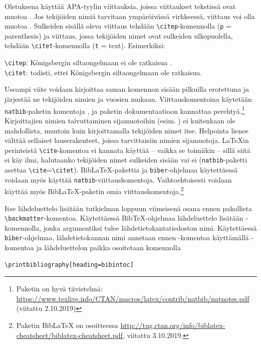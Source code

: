 Oletuksena \uefcsthesis käyttää APA-tyylin viittauksia, joissa viittaukset tekstissä ovat muotoa . Jos tekijöiden nimiä tarvitaan ympäröivässä virkkeessä, viittaus voi olla muotoa . Sulkeiden sisällä oleva viittaus tehdään \verb+\citep+-komennolla (\texttt{p} = parenthesis) ja viittaus, jossa tekijöiden nimet ovat sulkeiden ulkopuolella, tehdään \verb+\citet+-komennolla (\texttt{t} = text). Esimerkiksi:
\begin{displayquote}
  \verb+\citep+: Königsbergin siltaongelmaan ei ole ratkaisua \citep{euler36solutio}.\\
  \verb+\citet+: \citet{euler36solutio} todisti, ettei Königsbergin siltaongelmaan ole ratkaisua.
\end{displayquote}

Useampi viite voidaan kirjoittaa saman komennon sisään pilkuilla erotettuna ja \uefcsthesis järjestää ne tekijöiden nimien ja vuosien mukaan. Viittauskomentoina käytetään \texttt{natbib}-paketin komentoja \citep{natbib}, ja paketin dokumentaatioon kannattaa perehtyä.\footnote{Paketin  on hyvä tiivistelmä: \url{https://www.texlive.info/CTAN/macros/latex/contrib/natbib/natnotes.pdf} (viitattu 2.10.2019)} Kirjoittajien nimien taivuttaminen sijamuotoihin (esim. ) ei kuitenkaan ole mahdollista, muutoin kuin kirjoittamalla tekijöiden nimet itse. Helpointa lienee välttää sellaiset lauserakenteet, joissa tarvittaisiin nimien sijamuotoja. \LaTeX{in} perinteistä \verb+\cite+-komentoa ei kannata käyttää -- vaikka se toimiikin -- sillä siitä ei käy ilmi, halutaanko tekijöiden nimet sulkeiden sisään vai ei (\texttt{natbib}-paketti asettaa \verb+\cite+=\verb+\citet+). Bib\LaTeX-pakettia ja \texttt{biber}-ohjelmaa käytettäessä voidaan myös käyttää \texttt{natbib}-viittauskomentoja. Vaihtoehtoisesti voidaan käyttää myös Bib\LaTeX-paketin omia viittauskomentoja.\footnote{Paketin Bib\LaTeX{}  on osoitteessa \url{http://tug.ctan.org/info/biblatex-cheatsheet/biblatex-cheatsheet.pdf}, viitattu 3.10.2019.}

Itse lähdeluettelo lisätään tutkielman loppuun viimeisenä osana ennen pakollista \verb+\backmatter+-komentoa. Käytettäessä Bib\TeX-ohjelmaa lähdeluettelo lisätään \verb++-komennolla, jonka argumentiksi tulee lähdetietokantatiedoston nimi. Käytettäessä \texttt{biber}-ohjelmaa, lähdetietokannan nimi annetaan ennen \verb++-komentoa käyttämällä \verb++-komentoa ja lähdeluettelon paikka osoitetaan komennolla
\begin{verbatim}
\printbibliography[heading=bibintoc]
\end{verbatim}
  
